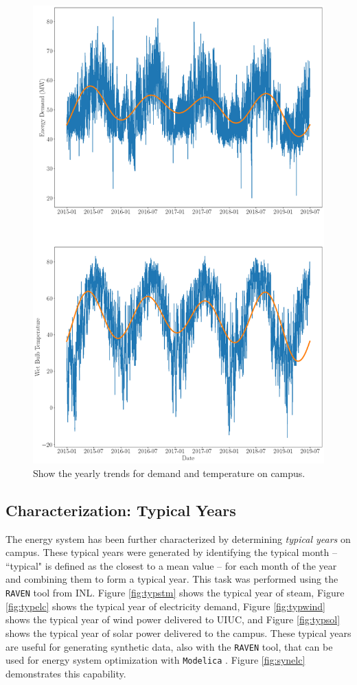 \begin{figure}[H]
  \centering
  \includegraphics[width=\textwidth]{yearlytrends}
  \caption{Show the yearly trends for demand and temperature on campus.}
  \label{fig:yearlytrends}
\end{figure}

\subsection{Characterization: Typical Years}

The energy system has been further characterized by determining \textit{typical years}
on campus. These typical years were generated by identifying the typical month --  ``typical" is defined as the closest to a mean value -- for each month of the
year and combining them to form a typical year. This task was performed using
the \texttt{RAVEN} tool from INL. Figure \ref{fig:typstm} shows the typical year
of steam, Figure \ref{fig:typelc} shows the typical year of electricity demand,
Figure \ref{fig:typwind} shows the typical year of wind power delivered to UIUC, and Figure \ref{fig:typsol} shows the typical year of solar power
delivered to the campus. These typical years are useful for generating synthetic
data, also with the \texttt{RAVEN} tool, that can be used for energy system
optimization with \texttt{Modelica} \cite{epiney_report_2017, baker_optimal_2018}. Figure \ref{fig:synelc} demonstrates this capability.

